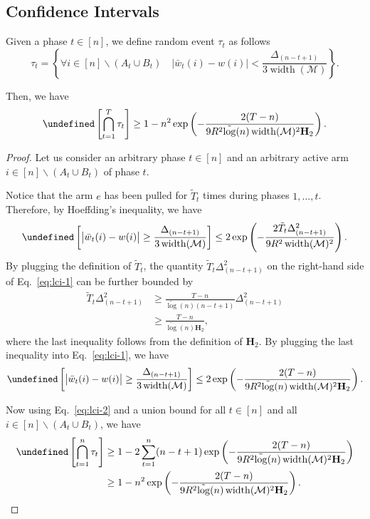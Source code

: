 \documentclass{article}
\newcommand{\M}{\mathcal M}
\newcommand{\del}{\backslash}
\DeclareMathOperator{\rank}{width}
\newcommand{\barlog}{\tilde{\log}}
\let\Pr\undefined
\DeclareMathOperator{\Pr}{Pr}
\begin{document}
\subsection{Confidence Intervals}

\begin{lemma}
\label{lemma:fbudget:ci}

Given a phase $t\in[n]$, we define random event $\tau_t$ as follows
\begin{equation}
\label{eq:define-tau}
\tau_t = \left\{\forall i\in[n] \del (A_t\cup B_t) \quad \big|\bar w_t(i)-w(i)\big| < \frac{\Delta_{(n-t+1)}}{3\rank(\M)} \right\}.
\end{equation}

Then, we have
\begin{equation}
\Pr\left[\bigcap_{t=1}^T \tau_t \right] \ge 1- n^2  \exp\left(-\frac{2(T-n)}{9R^2 \barlog(n) \rank(\M)^2 \mathbf H_2} \right).
\end{equation}
\end{lemma}

\begin{proof}
Let us consider an arbitrary phase $t\in [n]$ and an arbitrary active arm $i\in [n]\del (A_t\cup B_t)$ of phase $t$.

Notice that the arm $e$ has been pulled for $\tilde T_t$ times during phases $1,\ldots, t$. 
Therefore,
by Hoeffding's inequality, we have
\begin{align}
	\Pr\left[ \big|\bar w_t(i)-w(i)\big| \ge \frac{\Delta_{(n-t+1)}}{3\rank(\M)} \right] \le
	2\exp\left(-\frac{2\tilde T_t \Delta_{(n-t+1)}^2}{9R^2\rank(\M)^2} \right).
	\label{eq:lci-1}
\end{align}
By plugging the definition of $\tilde T_t$, the quantity $\tilde T_t\Delta_{(n-t+1)}^2$ on the right-hand side of Eq.~\eqref{eq:lci-1} can be further bounded by
\begin{align*}
\tilde T_t\Delta_{(n-t+1)}^2 
&\ge \frac{T-n}{\barlog(n)(n-t+1)}\Delta_{(n-t+1)}^2\\
&\ge \frac{T-n}{\barlog(n) \mathbf H_2},
\end{align*}
where the last inequality follows from the definition of $\mathbf H_2$.
By plugging the last inequality into Eq.~\eqref{eq:lci-1}, we have
\begin{equation}
\label{eq:lci-2}
	\Pr\left[ \big|\bar w_t(i)-w(i)\big| \ge \frac{\Delta_{(n-t+1)}}{3\rank(\M)} \right] \le
	2\exp\left(-\frac{2(T-n)}{9R^2 \barlog(n) \rank(\M)^2 \mathbf H_2} \right).
\end{equation}

Now using Eq.~\eqref{eq:lci-2} and a union bound for all $t \in [n]$ and all $i\in[n]\del (A_t\cup B_t)$, we have
\begin{align*}
\Pr\left[\bigcap_{t=1}^n \tau_t\right] &
\ge 1-2\sum_{t=1}^n (n-t+1)\exp\left(-\frac{2(T-n)}{9R^2 \barlog(n) \rank(\M)^2 \mathbf H_2} \right)\\
&\ge 1-n^2  \exp\left(-\frac{2(T-n)}{9R^2 \barlog(n) \rank(\M)^2 \mathbf H_2} \right).
\end{align*}

\end{proof}
\end{document}
